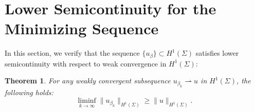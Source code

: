 \documentclass[a4, 12pt]{amsart}
\numberwithin{equation}{section} \numberwithin{equation}{section}
\newtheorem{thm}{Theorem}[section]
\begin{document}
\section{Lower Semicontinuity for the Minimizing Sequence}\label{section: Lower Semicontinuity}

In this section, we verify that the sequence $\{ u_\beta \} \subset H^1(\Sigma)$ satisfies lower semicontinuity with respect to weak convergence in $H^1(\Sigma)$:

\begin{thm}
For any weakly convergent subsequence $ u_{\beta_k} \rightharpoonup u $ in $H^1(\Sigma)$, the following holds:
\begin{equation}
\liminf_{k \to \infty} \| u_{\beta_k} \|_{H^1(\Sigma)} \geq \| u \|_{H^1(\Sigma)}.
\end{equation}
\end{thm}
\end{document}
